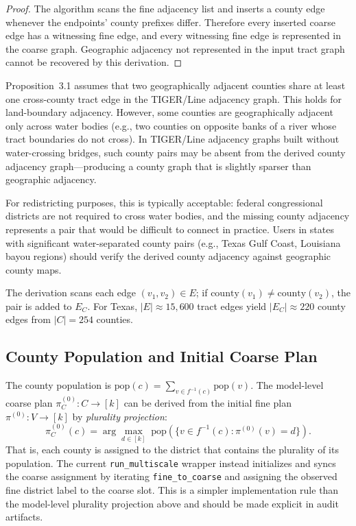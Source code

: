 \begin{proof}
The algorithm scans the fine adjacency list and inserts a county edge whenever
the endpoints' county prefixes differ. Therefore every inserted coarse edge has
a witnessing fine edge, and every witnessing fine edge is represented in the
coarse graph. Geographic adjacency not represented in the input tract graph
cannot be recovered by this derivation.
\end{proof}

\begin{remark}
Proposition~3.1 assumes that two geographically adjacent counties share at least one cross-county tract edge in the TIGER/Line adjacency graph. This holds for land-boundary adjacency. However, some counties are geographically adjacent only across water bodies (e.g., two counties on opposite banks of a river whose tract boundaries do not cross). In TIGER/Line adjacency graphs built without water-crossing bridges, such county pairs may be absent from the derived county adjacency graph---producing a county graph that is slightly sparser than geographic adjacency.

For redistricting purposes, this is typically acceptable: federal congressional districts are not required to cross water bodies, and the missing county adjacency represents a pair that would be difficult to connect in practice. Users in states with significant water-separated county pairs (e.g., Texas Gulf Coast, Louisiana bayou regions) should verify the derived county adjacency against geographic county maps.
\end{remark}

The derivation scans each edge $(v_1, v_2) \in E$; if
$\mathrm{county}(v_1) \neq \mathrm{county}(v_2)$, the pair is added to
$E_C$.
For Texas, $|E| \approx 15{,}600$ tract edges yield $|E_C| \approx 220$
county edges from $|C| = 254$ counties.

\subsection{County Population and Initial Coarse Plan}

The county population is
$\mathrm{pop}(c) = \sum_{v \in f^{-1}(c)} \mathrm{pop}(v)$.
The model-level coarse plan $\pi_C^{(0)} : C \to [k]$ can be derived from the
initial fine plan $\pi^{(0)} : V \to [k]$ by \emph{plurality projection}:
\[
  \pi_C^{(0)}(c) = \arg\max_{d \in [k]}\;
    \mathrm{pop}\!\left(\{v \in f^{-1}(c) : \pi^{(0)}(v) = d\}\right).
\]
That is, each county is assigned to the district that contains the plurality
of its population. The current \texttt{run\_multiscale} wrapper instead
initializes and syncs the coarse assignment by iterating
\texttt{fine\_to\_coarse} and assigning the observed fine district label to the
coarse slot. This is a simpler implementation rule than the model-level
plurality projection above and should be made explicit in audit artifacts.

